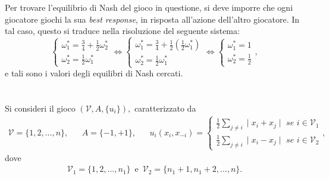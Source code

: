 \documentclass[11pt,largemargins]{homework}
\begin{document}
\begin{alphaparts}
    \questionpart
    Per trovare l'equilibrio di Nash del gioco in questione, si deve imporre che ogni giocatore giochi la sua \emph{best response}, in risposta all'azione dell'altro giocatore. In tal caso, questo si traduce nella risoluzione del seguente sistema:
    \begin{equation*}
    \begin{cases}\omega_{1}^{*}=\frac{3}{4}+\frac{1}{2}\omega_{2}^{*}\\
    \omega_{2}^{*}=\frac{1}{2}\omega_{1}^{*}\end{cases}\Leftrightarrow
    \begin{cases}\omega_{1}^{*}=\frac{3}{4}+\frac{1}{2}\left(\frac{1}{2}\omega_{1}^{*}\right)\\
    \omega_{2}^{*}=\frac{1}{2}\omega_{1}^{*}\end{cases}\Leftrightarrow\begin{cases}\omega_{1}^{*}=1\\\omega_{2}^{*}=\frac{1}{2}\end{cases},
    \end{equation*}
    e tali sono i valori degli equilibri di Nash cercati.
    \end{alphaparts}
    
    
\newpage

\section{}%

Si consideri il gioco $\left(\mathcal{V},A,\{u_{i}\}\right),$ caratterizzato da
\begin{align*}
\mathcal{V}=\{1,2,...,n\}, && A=\{-1,+1\}, && u_{i}\left(x_{i},x_{-i}\right)=\begin{cases}\frac{1}{2}\sum_{j\neq i}\mid x_{i}+x_{j}\mid \,\, se \, \, i\in \mathcal{V}_{1}\\\frac{1}{2}\sum_{j\neq i}\mid x_{i}-x_{j}\mid \,\, se \, \, i\in \mathcal{V}_{2}\end{cases},
\end{align*}
dove
\begin{align*}
\mathcal{V}_{1}=\{1,2,...,n_{1}\} \, \, \, \text{e} \, \, \, \mathcal{V}_{2}=\{n_{1}+1,n_{1}+2,...,n\}.
\end{align*}
\end{document}

